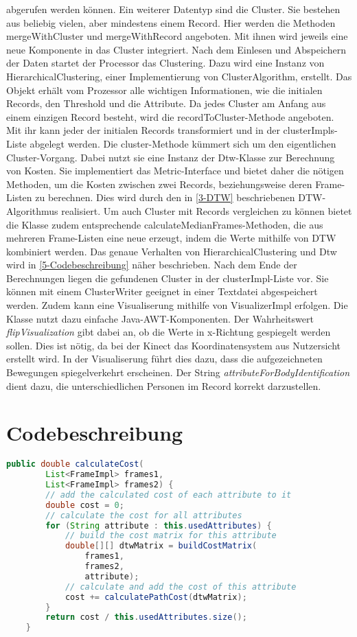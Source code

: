 abgerufen werden können.
Ein weiterer Datentyp sind die Cluster.
Sie bestehen aus beliebig vielen, aber mindestens einem Record.
Hier werden die Methoden mergeWithCluster und mergeWithRecord angeboten.
Mit ihnen wird jeweils eine neue Komponente in das Cluster integriert.
Nach dem Einlesen und Abspeichern der Daten startet der Processor das Clustering.
Dazu wird eine Instanz von HierarchicalClustering, einer Implementierung von ClusterAlgorithm, erstellt.
Das Objekt erhält vom Prozessor alle wichtigen Informationen,
wie die initialen Records, den Threshold und die Attribute.
Da jedes Cluster am Anfang aus einem einzigen Record besteht,
wird die recordToCluster-Methode angeboten.
Mit ihr kann jeder der initialen Records transformiert und in der clusterImpls-Liste abgelegt werden.
Die cluster-Methode kümmert sich um den eigentlichen Cluster-Vorgang.
Dabei nutzt sie eine Instanz der Dtw-Klasse zur Berechnung von Kosten.
Sie implementiert das Metric-Interface und bietet daher die nötigen Methoden,
um die Kosten zwischen zwei Records, beziehungsweise deren Frame-Listen zu berechnen.
Dies wird durch den in \autoref{3-DTW} beschriebenen \ac{DTW}-Algorithmus realisiert.
Um auch Cluster mit Records vergleichen zu können bietet die Klasse zudem entsprechende
calculateMedianFrames-Methoden, die aus mehreren Frame-Listen eine neue erzeugt,
indem die Werte mithilfe von \ac{DTW} kombiniert werden.
Das genaue Verhalten von HierarchicalClustering und Dtw wird in \autoref{5-Codebeschreibung} näher beschrieben.
Nach dem Ende der Berechnungen liegen die gefundenen Cluster in der clusterImpl-Liste vor.
Sie können mit einem ClusterWriter geeignet in einer Textdatei abgespeichert werden.
Zudem kann eine Visualiserung mithilfe von VisualizerImpl erfolgen.
Die Klasse nutzt dazu einfache Java-AWT-Komponenten.
Der Wahrheitswert \emph{flipVisualization} gibt dabei an,
ob die Werte in x-Richtung gespiegelt werden sollen.
Dies ist nötig, da bei der Kinect das Koordinatensystem aus Nutzersicht erstellt wird.
In der Visualiserung führt dies dazu, dass die aufgezeichneten Bewegungen spiegelverkehrt erscheinen.
Der String \emph{attributeForBodyIdentification} dient dazu,
die unterschiedlichen Personen im Record korrekt darzustellen.

\section{Codebeschreibung}
\label{5-Codebeschreibung}

\begin{lstlisting}[language=Java, caption=Berechnung der Kosten.]
    public double calculateCost(
        List<FrameImpl> frames1,
        List<FrameImpl> frames2) {
        // add the calculated cost of each attribute to it
        double cost = 0;
        // calculate the cost for all attributes
        for (String attribute : this.usedAttributes) {
            // build the cost matrix for this attribute
            double[][] dtwMatrix = buildCostMatrix(
                frames1,
                frames2,
                attribute);
            // calculate and add the cost of this attribute
            cost += calculatePathCost(dtwMatrix);
        }
        return cost / this.usedAttributes.size();
    }
\end{lstlisting}


